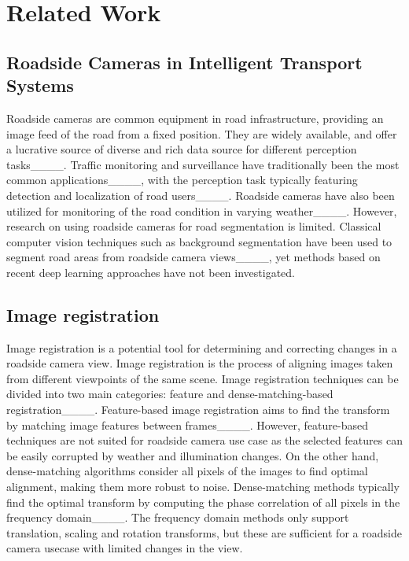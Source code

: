 \section{Related Work}
\subsection{Roadside Cameras in Intelligent Transport Systems}

Roadside cameras are common equipment in road infrastructure, providing an image feed of the road from a fixed position. They are widely available, and offer a lucrative source of diverse and rich data source for different perception tasks____. Traffic monitoring and surveillance have traditionally been the most common applications____, with the perception task typically featuring detection and localization of road users____. Roadside cameras have also been utilized for monitoring of the road condition in varying weather____. However, research on using roadside cameras for road segmentation is limited. Classical computer vision techniques such as background segmentation have been used to segment road areas from roadside camera views____, yet methods based on recent deep learning approaches have not been investigated.


\subsection{Image registration}

Image registration is a potential tool for determining and correcting changes in a roadside camera view. Image registration is the process of aligning images taken from different viewpoints of the same scene. Image registration techniques can be divided into two main categories: feature and dense-matching-based registration____. Feature-based image registration aims to find the transform by matching image features between frames____. However, feature-based techniques are not suited for roadside camera use case as the selected features can be easily corrupted by weather and illumination changes. On the other hand, dense-matching algorithms consider all pixels of the images to find optimal alignment, making them more robust to noise.  Dense-matching methods typically find the optimal transform by computing the phase correlation of all pixels in the frequency domain____. The frequency domain methods only support translation, scaling and rotation transforms, but these are sufficient for a roadside camera usecase with limited changes in the view. 

